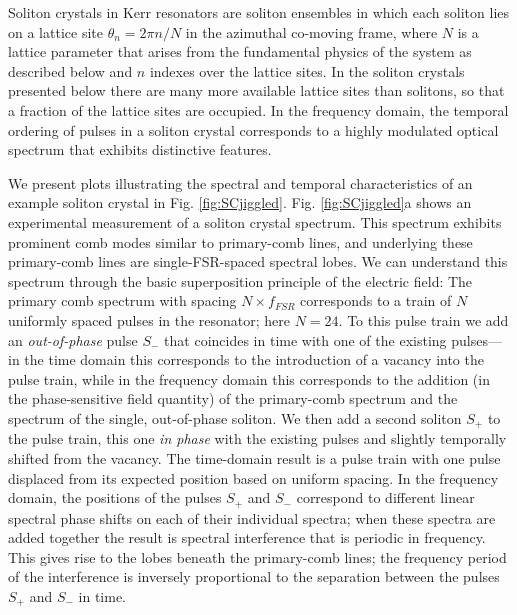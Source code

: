 Soliton crystals in Kerr resonators are soliton ensembles in which each soliton lies on a lattice site $\theta_n= 2\pi n/N$ in the azimuthal co-moving frame, where $N$ is a lattice parameter that arises from the fundamental physics of the system as described below and $n$ indexes over the lattice sites. In the soliton crystals presented below there are many more available lattice sites than solitons, so that a fraction of the lattice sites are occupied. In the frequency domain, the temporal ordering of pulses in a soliton crystal corresponds to a highly modulated optical spectrum that exhibits distinctive features. 

We present plots illustrating the spectral and temporal characteristics of an example soliton crystal in Fig. \ref{fig:SCjiggled}. Fig. \ref{fig:SCjiggled}a shows an experimental measurement of a soliton crystal spectrum. This spectrum exhibits prominent comb modes similar to primary-comb lines, and underlying these primary-comb lines are single-FSR-spaced spectral lobes. We can understand this spectrum through the basic superposition principle of the electric field: The primary comb spectrum with spacing $N\times f_{FSR}$ corresponds to a train of $N$ uniformly spaced pulses in the resonator; here $N=24$. To this pulse train we add an \textit{out-of-phase} pulse $S_-$ that coincides in time with one of the existing pulses---in the time domain this corresponds to the introduction of a vacancy into the pulse train, while in the frequency domain this corresponds to the addition (in the phase-sensitive field quantity) of the primary-comb spectrum and the spectrum of the single, out-of-phase soliton. We then add a second soliton $S_+$  to the pulse train, this one \textit{in phase} with the existing pulses and slightly temporally shifted from the vacancy. The time-domain result is a pulse train with one pulse displaced from its expected position based on uniform spacing. In the frequency domain, the positions of the pulses $S_+$ and $S_-$ correspond to different linear spectral phase shifts on each of their individual spectra; when these spectra are added together the result is spectral interference that is periodic in frequency. This gives rise to the lobes beneath the primary-comb lines; the frequency period of the interference is inversely proportional to the separation between the pulses $S_+$ and $S_-$ in time.

